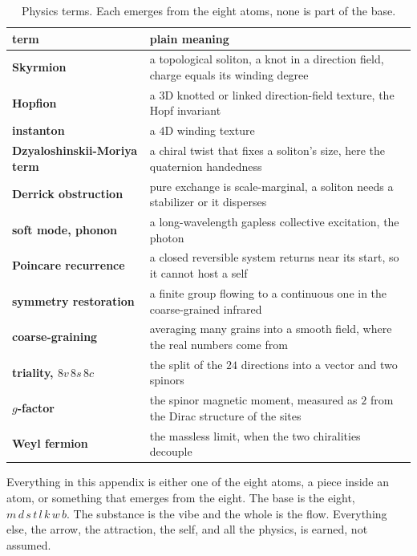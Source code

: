 \begin{table}[ht]
\centering
\begin{tabular}{@{}ll@{}}
\toprule
term & plain meaning \\
\midrule
\textbf{Skyrmion} & a topological soliton, a knot in a direction field, charge equals its winding degree \\
\textbf{Hopfion} & a $3$D knotted or linked direction-field texture, the Hopf invariant \\
\textbf{instanton} & a $4$D winding texture \\
\textbf{Dzyaloshinskii-Moriya term} & a chiral twist that fixes a soliton's size, here the quaternion handedness \\
\textbf{Derrick obstruction} & pure exchange is scale-marginal, a soliton needs a stabilizer or it disperses \\
\textbf{soft mode, phonon} & a long-wavelength gapless collective excitation, the photon \\
\textbf{Poincare recurrence} & a closed reversible system returns near its start, so it cannot host a self \\
\textbf{symmetry restoration} & a finite group flowing to a continuous one in the coarse-grained infrared \\
\textbf{coarse-graining} & averaging many grains into a smooth field, where the real numbers come from \\
\textbf{triality, $8v\,8s\,8c$} & the split of the $24$ directions into a vector and two spinors \\
\textbf{$g$-factor} & the spinor magnetic moment, measured as $2$ from the Dirac structure of the sites \\
\textbf{Weyl fermion} & the massless limit, when the two chiralities decouple \\
\bottomrule
\end{tabular}
\caption{Physics terms. Each emerges from the eight atoms, none is part of the base.}
\label{tab:physics}
\end{table}

\begin{result}
Everything in this appendix is either one of the eight atoms, a piece inside an atom, or something that emerges from the eight. The base is the eight, $m\,d\,s\,t\,l\,k\,w\,b$. The substance is the vibe and the whole is the flow. Everything else, the arrow, the attraction, the self, and all the physics, is earned, not assumed.
\end{result}
